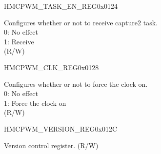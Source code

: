 \begin{register}{H}{MCPWM\_TASK\_EN\_REG}{0x0124}
\begin{regdesc}
\begin{reglist}
\label{fielddesc:MCPWMTASKCAP2EN}\item [MCPWM\_TASK\_CAP2\_EN] Configures whether or not to receive capture2 task. \\0: No effect \\1: Receive \\(R/W)
\end{reglist}\end{regdesc}
\end{register}


\begin{register}{H}{MCPWM\_CLK\_REG}{0x0128}\label{regdesc:MCPWMCLKREG}
%
%
\regnewline%
\begin{regdesc}\begin{reglist}
\label{fielddesc:MCPWMCLKEN}\item [MCPWM\_CLK\_EN] Configures whether or not to force the clock on. \\
0: No effect \\
1: Force the clock on \\
(R/W)
\end{reglist}\end{regdesc}
\end{register}


\begin{register}{H}{MCPWM\_VERSION\_REG}{0x012C}\label{regdesc:MCPWMVERSIONREG}
%
%
\regnewline%
\begin{regdesc}\begin{reglist}
\label{fielddesc:MCPWMDATE}\item [MCPWM\_DATE] Version control register. (R/W)
\end{reglist}\end{regdesc}
\end{register}
